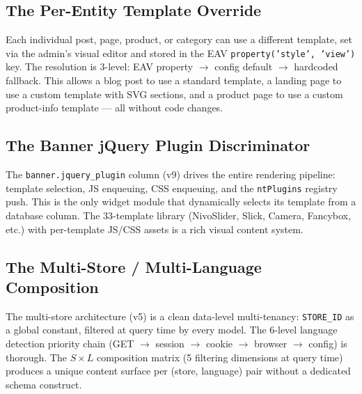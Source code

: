 \documentclass[11pt,a4paper]{article}
\begin{document}
\subsection{The Per-Entity Template Override}

\begin{goodbox}
Each individual post, page, product, or category can use a different
template, set via the admin's visual editor and stored in the EAV
\texttt{property('style', 'view')} key. The resolution is 3-level:
EAV property $\to$ config default $\to$ hardcoded fallback. This
allows a blog post to use a standard template, a landing page to use
a custom template with SVG sections, and a product page to use a
custom product-info template --- all without code changes.
\end{goodbox}

\subsection{The Banner jQuery Plugin Discriminator}

\begin{goodbox}
The \texttt{banner.jquery\_plugin} column (v9) drives the entire
rendering pipeline: template selection, JS enqueuing, CSS enqueuing,
and the \texttt{ntPlugins} registry push. This is the only widget
module that dynamically selects its template from a database column.
The 33-template library (NivoSlider, Slick, Camera, Fancybox, etc.)
with per-template JS/CSS assets is a rich visual content system.
\end{goodbox}

\subsection{The Multi-Store / Multi-Language Composition}

\begin{goodbox}
The multi-store architecture (v5) is a clean data-level multi-tenancy:
\texttt{STORE\_ID} as a global constant, filtered at query time by
every model. The 6-level language detection priority chain
(GET $\to$ session $\to$ cookie $\to$ browser $\to$ config) is thorough.
The $S \times L$ composition matrix (5 filtering dimensions at query
time) produces a unique content surface per (store, language) pair
without a dedicated schema construct.
\end{goodbox}
\end{document}
